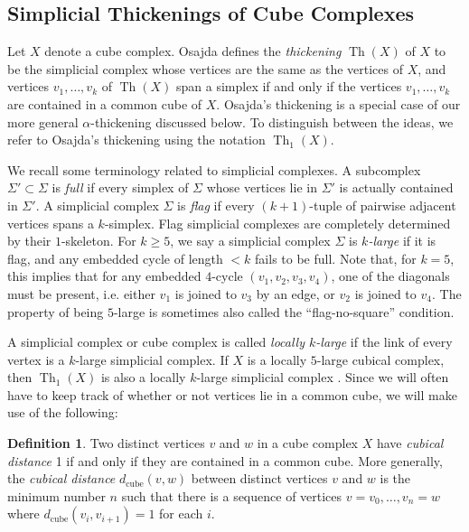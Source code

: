 \documentclass[12pt, letterpaper]{article}
\newcommand{\Th}{\operatorname{Th}}
\theoremstyle{plain}
\theoremstyle{definition}
\newtheorem{defn}[thm]{Definition}
\begin{document}
\subsection{Simplicial Thickenings of Cube Complexes}\label{sec:alpha-thickening}

Let $X$ denote a cube complex. Osajda \cite{osajda} defines the \emph{thickening} $\Th(X)$ of $X$ to be the simplicial complex whose vertices are the same as the vertices of $X$, and vertices $v_1, \hdots, v_k$ of $\Th(X)$ span a simplex if and only if the vertices $v_1 , \hdots, v_k$ are contained in a common cube of $X$. Osajda's thickening is a special case of our more general $\alpha$-thickening discussed below. To distinguish between the ideas, we refer to Osajda's thickening using the notation $\Th_1(X)$.

We recall some terminology related to simplicial complexes. A subcomplex $\Sigma\prime \subset \Sigma$ is \emph{full} if every simplex of $\Sigma$ whose vertices lie in $\Sigma\prime$ is actually contained in $\Sigma\prime$. A simplicial complex $\Sigma$ is \emph{flag} if every $(k+1)$-tuple of pairwise adjacent vertices spans a $k$-simplex. Flag simplicial complexes are completely determined by their $1$-skeleton. For $k\geq 5$, we say a simplicial complex $\Sigma$ is \emph{$k$-large} if it is flag, and any embedded cycle of length $<k$ fails to be full. Note that, for $k=5$, this implies that for any embedded $4$-cycle $(v_1, v_2, v_3, v_4)$, one of the diagonals must be present, i.e. either $v_1$ is joined to $v_3$ by an edge, or $v_2$ is joined to $v_4$. The property of being $5$-large is sometimes also called the ``flag-no-square'' condition. 

A simplicial complex or cube complex is called \emph{locally $k$-large} if the link of every vertex is a $k$-large simplicial complex. If $X$ is a locally $5$-large cubical complex, then $\Th_1(X)$ is also a locally $k$-large simplicial complex \cite[Lem.\ 3.2]{osajda}. Since we will often have to keep track of whether or not vertices lie in a common cube, we will make use of the following:

\begin{defn}
    Two distinct vertices $v$ and $w$ in a cube complex $X$ have \emph{cubical distance} 1 if and only if they are contained in a common cube. More generally, the \emph{cubical distance} $d_{\text{cube}}(v,w)$ between distinct vertices $v$ and $w$ is the minimum number $n$ such that there is a sequence of vertices ${v=v_0,\ldots,v_n=w}$ where $d_{\text{cube}}(v_i,v_{i+1})=1$ for each $i$.
\end{defn}
\end{document}
